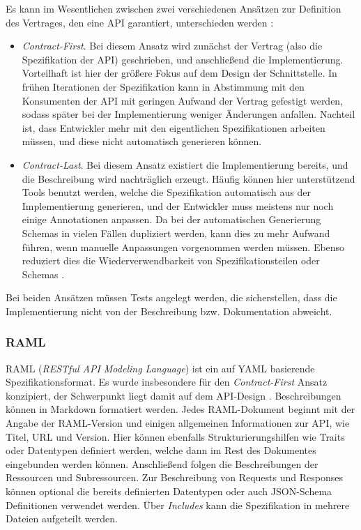Es kann im Wesentlichen zwischen zwei verschiedenen Ansätzen zur Definition des Vertrages, den eine API garantiert, unterschieden werden \parencite[272]{spichale2017api}:

\begin{itemize}
	\item \emph{Contract-First}. Bei diesem Ansatz wird zunächst der Vertrag (also die Spezifikation der API) geschrieben, und anschließend die Implementierung. Vorteilhaft ist hier der größere Fokus auf dem Design der Schnittstelle. In frühen Iterationen der Spezifikation kann in Abstimmung mit den Konsumenten der API mit geringen Aufwand der Vertrag gefestigt werden, sodass später bei der Implementierung weniger Änderungen anfallen. Nachteil ist, dass Entwickler mehr mit den eigentlichen Spezifikationen arbeiten müssen, und diese nicht automatisch generieren können.
	\item \emph{Contract-Last}. Bei diesem Ansatz existiert die Implementierung bereits, und die Beschreibung wird nachträglich erzeugt. Häufig können hier unterstützend Tools benutzt werden, welche die Spezifikation automatisch aus der Implementierung generieren, und der Entwickler muss meistens nur noch einige Annotationen anpassen. Da bei der automatischen Generierung Schemas in vielen Fällen dupliziert werden, kann dies zu mehr Aufwand führen, wenn manuelle Anpassungen vorgenommen werden müssen. Ebenso reduziert dies die Wiederverwendbarkeit von Spezifikationsteilen oder Schemas \parencite[1]{zhong2009contract}.
\end{itemize}

Bei beiden Ansätzen müssen Tests angelegt werden, die sicherstellen, dass die Implementierung nicht von der Beschreibung bzw. Dokumentation abweicht.
 
\subsubsection{RAML}
RAML (\emph{RESTful API Modeling Language}) ist ein auf YAML basierende Spezifikationsformat. Es wurde insbesondere für den \emph{Contract-First} Ansatz konzipiert, der Schwerpunkt liegt damit auf dem API-Design \parencites[277]{spichale2017api}[165]{tilkov2015rest}. Beschreibungen können in Markdown formatiert werden. Jedes RAML-Dokument beginnt mit der Angabe der RAML-Version und einigen allgemeinen Informationen zur API, wie Titel, URL und Version. Hier können ebenfalls Strukturierungshilfen wie Traits oder Datentypen definiert werden, welche dann im Rest des Dokumentes eingebunden werden können. Anschließend folgen die Beschreibungen der Ressourcen und Subressourcen. Zur Beschreibung von Requests und Responses können optional die bereits definierten Datentypen oder auch JSON-Schema Definitionen verwendet werden. Über \emph{Includes} kann die Spezifikation in mehrere Dateien aufgeteilt werden.

